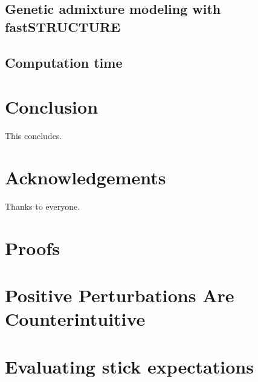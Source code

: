 \documentclass[11pt]{article}
\begin{document}
    \subsection{Genetic admixture modeling with fastSTRUCTURE}
    

    \subsection{Computation time}
    

\section{Conclusion}
This concludes.

% 



\section{Acknowledgements}
Thanks to everyone.






\clearpage
\newpage

\appendix

\section*{Proofs}


\section*{Positive Perturbations Are Counterintuitive}


\section{Evaluating stick expectations}

\end{document}
